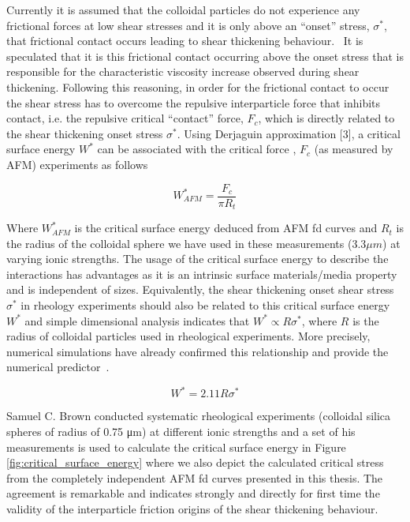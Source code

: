 Currently it is assumed that the colloidal particles do not experience any frictional forces at low shear stresses and it is only above an ``onset'' stress, $\sigma^*$, that frictional contact occurs leading to shear thickening behaviour.~\cite{reference2} It is speculated that it is this frictional contact occurring above the onset stress that is responsible for the characteristic viscosity increase observed during shear thickening. Following this reasoning, in order for the frictional contact to occur the shear stress has to overcome the repulsive interparticle force that inhibits contact, i.e. the repulsive critical “contact” force, $F_c$, which is directly related to the shear thickening onset stress $\sigma^*$. Using Derjaguin approximation [3], a critical surface energy $W^*$ can be associated with the critical force , $F_c$ (as measured by AFM) experiments as follows

\[ W^*_{AFM} = \frac{F_c}{\pi R_t} \]

Where $W^*_{AFM}$ is the critical surface energy deduced from AFM fd curves and $R_t$ is the radius of the colloidal sphere we have used in these measurements ($3.3 \mu m$) at varying ionic strengths. The usage of the critical surface energy to describe the interactions has advantages as it is an intrinsic surface materials/media property and is independent of sizes. Equivalently, the shear thickening onset shear stress $\sigma^*$ in rheology experiments should also be related to this critical surface energy $W^*$ and simple dimensional analysis indicates that $W^* \propto R\sigma^*$, where $R$ is the radius of colloidal particles used in rheological experiments. More precisely, numerical simulations have already confirmed this relationship and provide the numerical predictor~\cite{reference4}.

\[ W^* = 2.11 R\sigma^* \]

Samuel C. Brown conducted systematic rheological experiments (colloidal silica spheres of radius of 0.75 μm) at different ionic strengths and a set of his measurements is used to calculate the critical surface energy in Figure \ref{fig:critical_surface_energy} where we also depict the calculated critical stress from the completely independent AFM fd curves presented in this thesis. The agreement is remarkable and indicates strongly and directly for first time the validity of the interparticle friction origins of the shear thickening behaviour.

